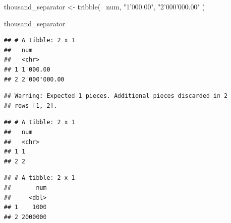 \documentclass[]{book}
\newenvironment{Shaded}{}{}
\newcommand{\DataTypeTok}[1]{#1}
\newcommand{\KeywordTok}[1]{\textcolor[rgb]{0.00,0.00,1.00}{#1}}
\newcommand{\NormalTok}[1]{#1}
\newcommand{\OperatorTok}[1]{#1}
\newcommand{\StringTok}[1]{\textcolor[rgb]{0.00,0.50,0.50}{#1}}
\begin{document}
\begin{Shaded}
\begin{Highlighting}[]
\NormalTok{thousand_separator <-}
\StringTok{  }\KeywordTok{tribble}\NormalTok{(}
    \OperatorTok{~}\NormalTok{num,}
    \StringTok{"1'000.00"}\NormalTok{,}
    \StringTok{"2'000'000.00"}
\NormalTok{  )}

\NormalTok{thousand_separator}
\end{Highlighting}
\end{Shaded}

\begin{verbatim}
## # A tibble: 2 x 1
##   num         
##   <chr>       
## 1 1'000.00    
## 2 2'000'000.00
\end{verbatim}

\begin{Shaded}
\end{Shaded}

\begin{verbatim}
## Warning: Expected 1 pieces. Additional pieces discarded in 2
## rows [1, 2].
\end{verbatim}

\begin{verbatim}
## # A tibble: 2 x 1
##   num  
##   <chr>
## 1 1    
## 2 2
\end{verbatim}

\begin{Shaded}
\end{Shaded}

\begin{verbatim}
## # A tibble: 2 x 1
##       num
##     <dbl>
## 1    1000
## 2 2000000
\end{verbatim}

\hypertarget{section}{%
\section{}\label{section}}
\end{document}

